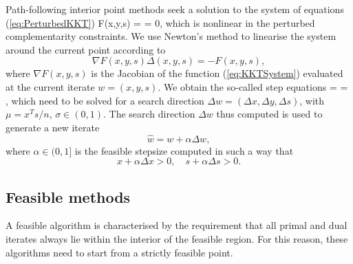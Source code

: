 Path-following interior point methods seek a solution 
to the system of equations (\ref{eq:PerturbedKKT})
\be  \label{eq:KKTSystem}
F(x,y,s) =  = 0,
\ee
which is nonlinear in the perturbed complementarity constraints.
We use Newton's method to linearise the system around the 
current point according to
\[
\nabla F(x,y,s) \Delta(x,y,s) = -F(x,y,s),
\]
where $\nabla F(x,y,s)$ is the Jacobian of the function (\ref{eq:KKTSystem})
evaluated at the current iterate $w = (x,y,s)$.
We obtain the so-called step equations
%
\be \label{eq:NewtonSystem}
 =
 =
\left[ \begin{array}{c}
    \xi_b \\ \xi_c \\ \xi_\mu
   \end{array} \right],
\ee
%
which need to be solved for a search direction
$\Delta w = (\Delta x, \Delta y, \Delta s)$,
with $\mu = x^Ts/n$, $\sigma \in (0,1)$.
The search direction $\Delta w$ thus computed is used to generate 
a new iterate
\[
  \hat w = w + \alpha\Delta w,
\]
where $\alpha \in (0,1]$ is the feasible stepsize computed in
such a way that
\[
   x + \alpha \Delta x > 0, \quad s + \alpha \Delta s > 0.
\]

%
%
\subsection{Feasible methods}
\label{sec:FeasibleMethods}

A feasible algorithm is characterised by the requirement that
all primal and dual iterates always lie within the interior 
of the feasible region. For this reason, these algorithms 
need to start from a strictly feasible point. 

